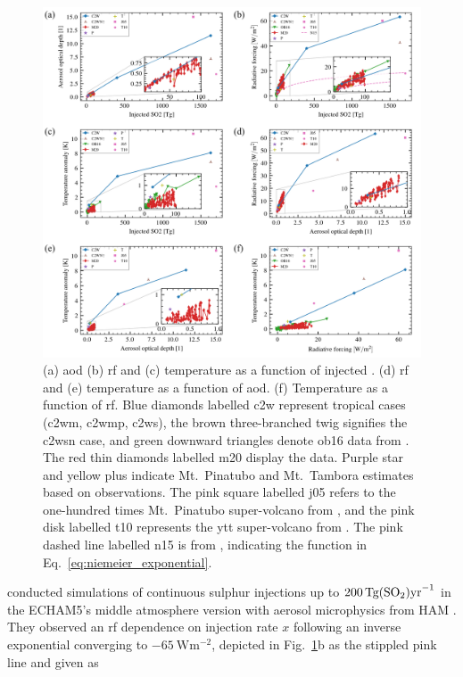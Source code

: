 \documentclass{ametsocV6.1}
\newcommand{\iso}[1][i]{{#1}njected \ce{SO2}}
\begin{document}
\begin{figure}
  \centering
  \includegraphics{figures/figure4.png}

  \caption{(a) \gls{aod} (b) \gls{rf} and (c) temperature as a function of \iso{}\@. (d)
    \gls{rf} and (e) temperature as a function of \gls{aod}. (f) Temperature as a function
    of \gls{rf}. Blue diamonds labelled \gls{c2w} represent tropical cases (\gls{c2wm},
    \gls{c2wmp}, \gls{c2ws}), the brown three-branched twig signifies the \gls{c2wsn} case,
    and green downward triangles denote \gls{ob16} data from \citet{ottobliesner2016}. The
    red thin diamonds labelled \gls{m20} display the \citet{marshall2020dataset} data.
    Purple star and yellow plus indicate Mt.\ Pinatubo and Mt.\ Tambora estimates based on
    observations. The pink square labelled \gls{j05} refers to the one-hundred times Mt.\
    Pinatubo super-volcano from \citet{jones2005}, and the pink disk labelled \gls{t10}
    represents the \gls{ytt} super-volcano from \citet{timmreck2010}. The pink dashed line
    labelled \gls{n15} is from \citet{niemeier2015}, indicating the function in
    Eq.~\ref{eq:niemeier_exponential}.}\label{fig:parameter_scan}%
\end{figure}

\citet{niemeier2015} conducted simulations of continuous sulphur injections up to
\(\SI{200}{\tera\gram(\ce{SO2})\mathrm{yr}^{-1}}\) in the ECHAM5's middle atmosphere
version \citep{giorgetta2006} with aerosol microphysics from HAM \citep{stier2005}. They
observed an \gls{rf} dependence on injection rate \(x\) following an inverse exponential
converging to \(\SI{-65}{\watt\meter^{-2}}\), depicted in Fig.~\ref{fig:parameter_scan}b
as the stippled pink line and given as
\end{document}
